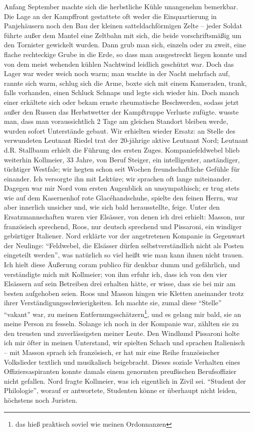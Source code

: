 \documentclass[a5paper,pagesize,10pt,twoside=true]{scrbook}
\begin{document}
Anfang September machte sich die herbstliche Kühle unangenehm bemerkbar. Die Lage an der Kampffront gestattete oft weder die Einquartierung in Panjehäusern noch den Bau der kleinen satteldachförmigen Zelte -- jeder Soldat führte außer dem Mantel eine Zeltbahn mit sich, die beide vorschriftsmäßig um den Tornister gewickelt wurden. Dann grub man sich, einzeln oder zu zweit, eine flache rechteckige Grube in die Erde, so dass man ausgestreckt liegen konnte und von dem meist wehenden kühlen Nachtwind leidlich geschützt war. Doch das Lager war weder weich noch warm; man wachte in der Nacht mehrfach auf, rannte sich warm, schlug sich die Arme, boxte sich mit einem Kameraden, trank, falls vorhanden, einen Schluck Schnaps und legte sich wieder hin. Doch manch einer erkältete sich oder bekam ernste rheumatische Beschwerden, sodass jetzt außer den Russen das Herbstwetter der Kampftruppe Verluste zufügte. wusste man, dass man voraussichtlich 2 Tage am gleichen Standort bleiben werde, wurden sofort Unterstände gebaut. Wir erhielten wieder Ersatz: an Stelle des verwundeten Leutnant Riedel trat der 20-jährige aktive Leutnant Nord; Leutnant d.R. Stallbaum erhielt die Führung des ersten Zuges. Kompaniefeldwebel blieb weiterhin Kollmeier, 33 Jahre, von Beruf Steiger, ein intelligenter, anständiger, tüchtiger Westfale; wir hegten schon seit Wochen freundschaftliche Gefühle für einander. Ich versorgte ihn mit Lektüre; wir sprachen oft lange miteinander. Dagegen war mir Nord vom ersten Augenblick an unsympathisch; er trug stets wie auf dem Kasernenhof rote Glacéhandschuhe, spielte den feinen Herrn, war aber innerlich unsicher und, wie sich bald herausstellte, feige. Unter den Ersatzmannschaften waren vier Elsässer, von denen ich drei erhielt: Masson, nur französisch sprechend, Roos, nur deutsch sprechend und Pissaroni, ein windiger gebürtiger Italiener. Nord erklärte vor der angetretenen Kompanie in Gegenwart der Neulinge: \enquote{Feldwebel, die Elsässer dürfen selbstverständlich nicht als Posten eingeteilt werden}, was natürlich so viel heißt wie man kann ihnen nicht trauen. Ich hielt diese Äußerung coram publico für denkbar dumm und gefährlich, und verständigte mich mit Kollmeier; von ihm erfuhr ich, dass ich von den vier Elsässern auf sein Betreiben drei erhalten hätte, er wisse, dass sie bei mir am besten aufgehoben seien. Roos und Masson hingen wie Kletten aneinander trotz ihrer Verständigungsschwierigkeiten. Ich machte sie, zumal diese \enquote{Stelle} \enquote{vakant} war, zu meinen Entfernungsschätzern\footnote{das hieß praktisch soviel wie meinen Ordonnanzen}, und es gelang mir bald, sie an meine Person zu fesseln. Solange ich noch in der Kompanie war, zählten sie zu den treusten und zuverlässigsten meiner Leute. Den Windhund Pissaroni holte ich mir öfter in meinen Unterstand, wir spielten Schach und sprachen Italienisch -- mit Masson sprach ich französisch, er hat mir eine Reihe französischer Volkslieder textlich und musikalisch beigebracht. Dieses soziale Verhalten eines Offiziersaspiranten konnte damals einem genormten preußischen Berufsoffizier nicht gefallen. Nord fragte Kollmeier, was ich eigentlich in Zivil sei. \enquote{Student der Philologie}, worauf er antwortete, Studenten könne er überhaupt nicht leiden, höchstens noch Juristen.
\end{document}
